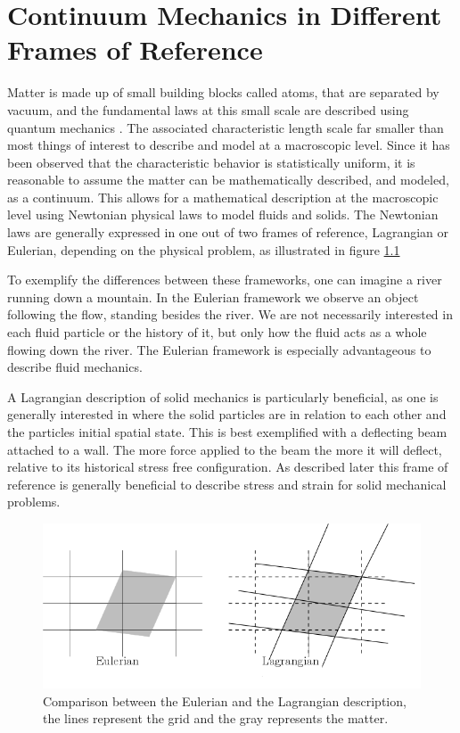 \chapter{Continuum Mechanics in Different Frames of Reference}
Matter is made up of small building blocks called atoms, that are separated by vacuum, and the fundamental laws at this small scale are described using quantum mechanics \cite{dirac1981principles}. The associated characteristic length scale far smaller than most things of interest to describe and model at a macroscopic level. Since it has been observed that the characteristic behavior is statistically uniform, it is reasonable to assume the matter can be mathematically described, and modeled, as a continuum. This allows for a mathematical description at the macroscopic level using Newtonian physical laws to model fluids and solids. The Newtonian laws are generally expressed in one out of two frames of reference, Lagrangian or Eulerian, depending on the physical problem, as illustrated in figure \ref{pic:E_L} \newline

To exemplify the differences between these frameworks, one can imagine a river running down a mountain.	
In the Eulerian framework we observe an object following the flow, standing besides the river. We are not necessarily interested in each fluid particle or the history of it, but only how the fluid acts as a whole flowing down the river. The Eulerian framework is especially advantageous to describe fluid mechanics.\newline

A Lagrangian description of solid mechanics is particularly beneficial, as one is generally interested in where the solid particles are in relation to each other and the particles initial spatial state.  
This is best exemplified with a deflecting beam attached to a wall. The more force applied to the beam the more it will deflect, relative to its historical stress free configuration. As described later this frame of reference is generally beneficial to describe stress and strain for solid mechanical problems.\newline

\begin{figure}[H]
\label{pic:E_L}
\includegraphics[scale=0.50]{./Continuum_mechanics/E_L.png}
\caption{Comparison between the Eulerian and the Lagrangian description, the lines represent the grid and the gray represents the matter.}
\end{figure}

